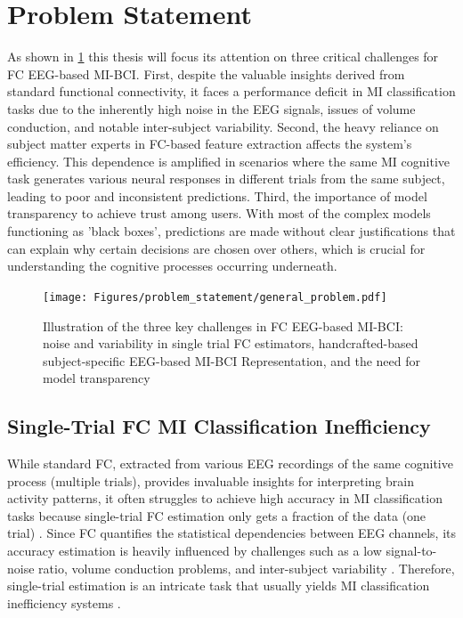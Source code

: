 \section{Problem Statement}\label{sec:problem_statement}

As shown in \cref{fig:gen_problem} this thesis will focus its attention on three critical challenges for FC EEG-based MI-BCI. First, despite the valuable insights derived from standard functional connectivity, it faces a performance deficit in MI classification tasks due to the inherently high noise in the EEG signals, issues of volume conduction, and notable inter-subject variability. Second, the heavy reliance on subject matter experts in FC-based feature extraction affects the system's efficiency. This dependence is amplified in scenarios where the same MI cognitive task generates various neural responses in different trials from the same subject, leading to poor and inconsistent predictions. Third, the importance of model transparency to achieve trust among users. With most of the complex models functioning as 'black boxes', predictions are made without clear justifications that can explain why certain decisions are chosen over others, which is crucial for understanding the cognitive processes occurring underneath.

\begin{figure}[!h]
    \centering
    \texttt{[image: Figures/problem\_statement/general\_problem.pdf]}
    \caption{Illustration of the three key challenges in FC EEG-based MI-BCI: noise and variability in single trial FC estimators, handcrafted-based subject-specific EEG-based MI-BCI Representation, and the need for model transparency}\label{fig:gen_problem}
\end{figure}


\subsection{Single-Trial FC MI Classification Inefficiency \label{sec:singlefc}}

While standard FC, extracted from various EEG recordings of the same cognitive process (multiple trials), provides invaluable insights for interpreting brain activity patterns, it often struggles to achieve high accuracy in MI classification tasks because single-trial FC estimation only gets a fraction of the data (one trial) \cite{chiarion2023connectivity, rodrigues2020single, billinger2013single}. Since FC quantifies the statistical dependencies between EEG channels, its accuracy estimation is heavily influenced by challenges such as a low signal-to-noise ratio, volume conduction problems, and inter-subject variability \cite{abiri2019comprehensive,bastos2016tutorial}. Therefore, single-trial estimation is an intricate task that usually yields MI classification inefficiency systems \cite{yang2021novel}. 

